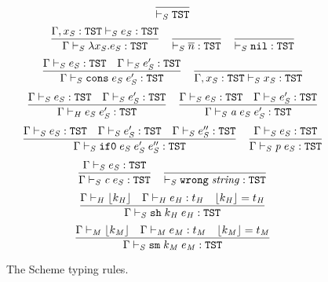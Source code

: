 \begin{figure}[p]
\caption{The Scheme typing rules.}
\[
\frac
{}
{ \vdash_{\mathit{S}} \mathtt{TST}}
\]
\bigskip
\[
\frac
{\Gamma , x_{\mathit{S}} : \mathtt{TST} \vdash_{\mathit{S}} e_{\mathit{S}} : \mathtt{TST}}
{\Gamma \vdash_{\mathit{S}} \lambda x_{\mathit{S}} . e_{\mathit{S}} : \mathtt{TST}}
\quad
\frac
{}
{ \vdash_{\mathit{S}} \overline{n} : \mathtt{TST}}
\quad
\frac
{}
{ \vdash_{\mathit{S}} \mathtt{nil} : \mathtt{TST}}
\]
\[
\frac
{\Gamma \vdash_{\mathit{S}} e_{\mathit{S}} : \mathtt{TST} \quad \Gamma \vdash_{\mathit{S}} e_{\mathit{S}}' : \mathtt{TST}}
{\Gamma \vdash_{\mathit{S}} \mathtt{cons} \; e_{\mathit{S}} \; e_{\mathit{S}}' : \mathtt{TST}}
\quad
\frac
{}
{\Gamma , x_{\mathit{S}} : \mathtt{TST} \vdash_{\mathit{S}} x_{\mathit{S}} : \mathtt{TST}}
\]
\[
\frac
{\Gamma \vdash_{\mathit{S}} e_{\mathit{S}} : \mathtt{TST} \quad \Gamma \vdash_{\mathit{S}} e_{\mathit{S}}' : \mathtt{TST}}
{\Gamma\vdash_{\mathit{H}}e_{\mathit{S}} \; e_{\mathit{S}}':\mathtt{TST}}
\quad
\frac
{\Gamma \vdash_{\mathit{S}} e_{\mathit{S}} : \mathtt{TST} \quad \Gamma \vdash_{\mathit{S}} e_{\mathit{S}}' : \mathtt{TST}}
{\Gamma \vdash_{\mathit{S}} \mathit{a} \; e_{\mathit{S}} \; e_{\mathit{S}}' : \mathtt{TST}}
\]
\[
\frac
{\Gamma \vdash_{\mathit{S}} e_{\mathit{S}} : \mathtt{TST} \quad \Gamma \vdash_{\mathit{S}} e_{\mathit{S}}' : \mathtt{TST} \quad \Gamma \vdash_{\mathit{S}} e_{\mathit{S}}'' : \mathtt{TST}}
{\Gamma \vdash_{\mathit{S}} \mathtt{if0} \; e_{\mathit{S}} \; e_{\mathit{S}}' \; e_{\mathit{S}}'' : \mathtt{TST}}
\quad
\frac
{\Gamma \vdash_{\mathit{S}} e_{\mathit{S}} : \mathtt{TST}}
{\Gamma \vdash_{\mathit{S}} \mathit{p} \; e_{\mathit{S}} : \mathtt{TST}}
\]
\[
\frac
{\Gamma \vdash_{\mathit{S}} e_{\mathit{S}} : \mathtt{TST}}
{\Gamma \vdash_{\mathit{S}} \mathit{c} \; e_{\mathit{S}} : \mathtt{TST}}
\quad
\frac
{}
{ \vdash_{\mathit{S}} \mathtt{wrong} \; \mathit{string} : \mathtt{TST}}
\]
\[
\frac
{\Gamma \vdash_{\mathit{H}} \lfloor k_{\mathit{H}} \rfloor \quad \Gamma \vdash_{\mathit{H}} e_{\mathit{H}} : t_{\mathit{H}} \quad \lfloor k_{\mathit{H}} \rfloor = t_{\mathit{H}}}
{\Gamma \vdash_{\mathit{S}} \mathtt{sh} \; k_{\mathit{H}} \; e_{\mathit{H}} : \mathtt{TST}}
\]
\[
\frac
{\Gamma \vdash_{\mathit{M}} \lfloor k_{\mathit{M}} \rfloor \quad \Gamma \vdash_{\mathit{M}} e_{\mathit{M}} : t_{\mathit{M}} \quad \lfloor k_{\mathit{M}} \rfloor = t_{\mathit{M}}}
{\Gamma \vdash_{\mathit{S}} \mathtt{sm} \; k_{\mathit{M}} \; e_{\mathit{M}} : \mathtt{TST}}
\]
\label{figstr}
\end{figure}